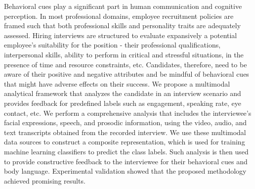 Behavioral cues play a significant part in human communication and cognitive perception. In most professional domains, employee recruitment policies are framed such that both professional skills and personality traits are adequately assessed. Hiring interviews are structured to evaluate expansively a potential employee's suitability for the position - their professional qualifications, interpersonal skills, ability to perform in critical and stressful situations, in the presence of time and resource constraints, etc. Candidates, therefore, need to be aware of their positive and negative attributes and be mindful of behavioral cues that might have adverse effects on their success. We propose a multimodal analytical framework that analyzes the candidate in an interview scenario and provides feedback for predefined labels such as engagement, speaking rate, eye contact, etc. We perform a comprehensive analysis that includes the interviewee's facial expressions, speech, and prosodic information, using the video, audio, and text transcripts obtained from the recorded interview. We use these multimodal data sources to construct a composite representation, which is used for training machine learning classifiers to predict the class labels. Such analysis is then used to provide constructive feedback to the interviewee for their behavioral cues and body language. Experimental validation showed that the proposed methodology achieved promising results.
